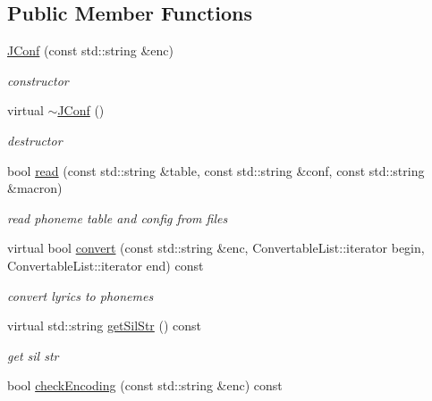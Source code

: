 \subsection*{\-Public \-Member \-Functions}
\begin{DoxyCompactItemize}
\item 
\hyperlink{classsinsy_1_1JConf_a1bc3b834b00c92f78a42529252a89f95}{\-J\-Conf} (const std\-::string \&enc)
\begin{DoxyCompactList}\small\item\em constructor \end{DoxyCompactList}\item 
\hypertarget{classsinsy_1_1JConf_a6bbe7a54ed73b9bccb6abf6c8ca5ff2a}{virtual \hyperlink{classsinsy_1_1JConf_a6bbe7a54ed73b9bccb6abf6c8ca5ff2a}{$\sim$\-J\-Conf} ()}\label{classsinsy_1_1JConf_a6bbe7a54ed73b9bccb6abf6c8ca5ff2a}

\begin{DoxyCompactList}\small\item\em destructor \end{DoxyCompactList}\item 
bool \hyperlink{classsinsy_1_1JConf_a472b3cdcb61dace17ade9a5998d417a5}{read} (const std\-::string \&table, const std\-::string \&conf, const std\-::string \&macron)
\begin{DoxyCompactList}\small\item\em read phoneme table and config from files \end{DoxyCompactList}\item 
\hypertarget{classsinsy_1_1JConf_afb3b14617a4c8617b46a037e9237b47a}{virtual bool \hyperlink{classsinsy_1_1JConf_afb3b14617a4c8617b46a037e9237b47a}{convert} (const std\-::string \&enc, \-Convertable\-List\-::iterator begin, \-Convertable\-List\-::iterator end) const }\label{classsinsy_1_1JConf_afb3b14617a4c8617b46a037e9237b47a}

\begin{DoxyCompactList}\small\item\em convert lyrics to phonemes \end{DoxyCompactList}\item 
virtual std\-::string \hyperlink{classsinsy_1_1JConf_abab4dec7dd8ea8ef959b8c95df34ae07}{get\-Sil\-Str} () const 
\begin{DoxyCompactList}\small\item\em get sil str \end{DoxyCompactList}\item 
\hypertarget{classsinsy_1_1JConf_a7e92eca34eb52c61e8f687814df10fab}{bool \hyperlink{classsinsy_1_1JConf_a7e92eca34eb52c61e8f687814df10fab}{check\-Encoding} (const std\-::string \&enc) const }\label{classsinsy_1_1JConf_a7e92eca34eb52c61e8f687814df10fab}


\end{DoxyCompactItemize}
